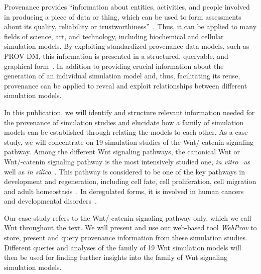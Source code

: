 \documentclass[10pt,letterpaper]{article}
\newcommand{\webprov}{\textit{WebProv}}
\newcommand{\bcat}{\textbeta-catenin}
\newcommand{\wnt}{Wnt}
\begin{document}
Provenance provides \enquote{information about entities, activities, and people involved in producing a piece of data or thing, which can be used to form assessments about its quality, reliability or trustworthiness}~\cite{Belhajjame2013}.
Thus, it can be applied to many fields of science, art, and technology, including biochemical and cellular simulation models.
By exploiting standardized provenance data models, such as PROV-DM, this information is presented in a structured, queryable, and graphical form~\cite{Ruscheinski2018, Ruscheinski2017}.
In addition to providing crucial information about the generation of an individual simulation model and, thus, facilitating its reuse, provenance can be applied to reveal and exploit relationships between different simulation models.

In this publication, we will identify and structure relevant information needed for the provenance of simulation studies and elucidate how a family of simulation models can be established through relating the models to each other.
As a case study, we will concentrate on 19 simulation studies of the \wnt{}/\bcat{} signaling pathway.
Among the different \wnt{} signaling pathways, the canonical \wnt{} or \wnt{}/\bcat{} signaling pathway is the most intensively studied one, \textit{in vitro}~\cite{MacDonald2009} as well as \textit{in silico}~\cite{Lloyd-Lewis2013}.
This pathway is considered to be one of the key pathways in development and regeneration, including cell fate, cell proliferation, cell migration and adult homeostasis~\cite{Steinhart2018, Giles2003}.
In deregulated forms, it is involved in human cancers and developmental disorders~\cite{Clevers2012, Logan2004}.

Our case study refers to the \wnt{}/\bcat{} signaling pathway only, which we call \wnt{} throughout the text.
We will present and use our web-based tool \webprov{} to store, present and query provenance information from these simulation studies.
Different queries and analyses of the family of 19 \wnt{} simulation models will then be used for finding further insights into the family of \wnt{} signaling simulation models.


\end{document}
